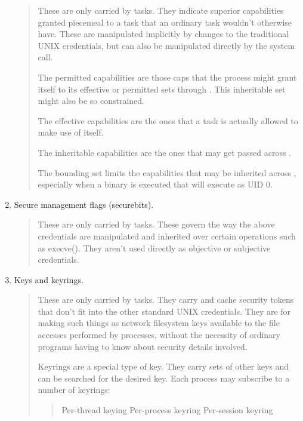 \documentclass[a4paper,8pt,english]{sphinxmanual}
\begin{document}
\begin{enumerate}
\begin{quote}
\begin{itemize}
\end{itemize}

These are only carried by tasks.  They indicate superior capabilities
granted piecemeal to a task that an ordinary task wouldn't otherwise have.
These are manipulated implicitly by changes to the traditional UNIX
credentials, but can also be manipulated directly by the 
system call.

The permitted capabilities are those caps that the process might grant
itself to its effective or permitted sets through .  This
inheritable set might also be so constrained.

The effective capabilities are the ones that a task is actually allowed to
make use of itself.

The inheritable capabilities are the ones that may get passed across
.

The bounding set limits the capabilities that may be inherited across
, especially when a binary is executed that will execute as
UID 0.
\end{quote}

\item {} 
Secure management flags (securebits).
\begin{quote}

These are only carried by tasks.  These govern the way the above
credentials are manipulated and inherited over certain operations such as
execve().  They aren't used directly as objective or subjective
credentials.
\end{quote}

\item {} 
Keys and keyrings.
\begin{quote}

These are only carried by tasks.  They carry and cache security tokens
that don't fit into the other standard UNIX credentials.  They are for
making such things as network filesystem keys available to the file
accesses performed by processes, without the necessity of ordinary
programs having to know about security details involved.

Keyrings are a special type of key.  They carry sets of other keys and can
be searched for the desired key.  Each process may subscribe to a number
of keyrings:
\begin{quote}

Per-thread keying
Per-process keyring
Per-session keyring
\end{quote}


\end{quote}
\end{enumerate}
\end{document}
